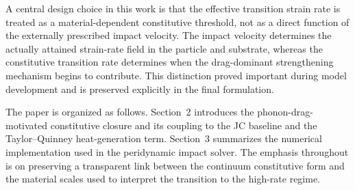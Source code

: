 A central design choice in this work is that the effective transition strain rate is treated as a material-dependent constitutive threshold, not as a direct function of the externally prescribed impact velocity. The impact velocity determines the actually attained strain-rate field in the particle and substrate, whereas the constitutive transition rate determines when the drag-dominant strengthening mechanism begins to contribute. This distinction proved important during model development and is preserved explicitly in the final formulation.

The paper is organized as follows. Section~2 introduces the phonon-drag-motivated constitutive closure and its coupling to the JC baseline and the Taylor--Quinney heat-generation term. Section~3 summarizes the numerical implementation used in the peridynamic impact solver. The emphasis throughout is on preserving a transparent link between the continuum constitutive form and the material scales used to interpret the transition to the high-rate regime.
